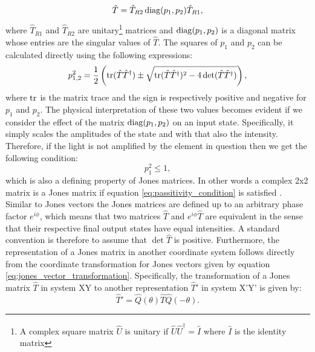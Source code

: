 \begin{equation}
    \label{eq:jones_singular_value_decomposition}
    \hat{T} = \hat{T}_{R2}\operatorname{diag}(p_1, p_2)\hat{T}_{R1},
\end{equation}
where $\hat{T}_{R1}$ and $\hat{T}_{R2}$ are unitary\footnote{A complex square matrix $\hat{U}$ is unitary if $\hat{U} \hat{U}^\dagger=\hat{I}$ where $\hat{I}$ is the identity matrix} matrices and $\operatorname{diag}(p_1, p_2)$ is a diagonal matrix whose entries are the singular values of $\hat{T}$. The squares of $p_1$ and $p_2$ can be calculated directly using the following expressions:
\begin{equation}
    p_{1,2}^2 = \frac{1}{2}\left(\operatorname{tr}(\hat{T}\hat{T}^{\dagger}) \pm 
    \sqrt{\operatorname{tr}(\hat{T}\hat{T}^{\dagger})^2-4\det(\hat{T}\hat{T}^{\dagger})}\right),
\end{equation}
where $\operatorname{tr}$ is the matrix trace and the sign is respectively positive and negative for $p_1$ and $p_2$. The physical interpretation of these two values becomes evident if we consider the effect of the matrix $\operatorname{diag}(p_1, p_2)$ on an input state. Specifically, it simply scales the amplitudes of the state and with that also the intensity. Therefore, if the light is not amplified by the element in question then we get the following condition:
\begin{equation}
    \label{eq:passitivity_condition}
    p_1^2 \leq 1,
\end{equation}
which is also a defining property of Jones matrices. In other words a complex 2x2 matrix is a Jones matrix if equation \ref{eq:passitivity_condition} is satisfied \cite{Barakat1987ConditionsSystems}. Similar to Jones vectors the Jones matrices are defined up to an arbitrary phase factor $e^{i\phi}$, which means that two matrices $\hat{T}$ and $e^{i\phi}\hat{T}$ are equivalent in the sense that their respective final output states have equal intensities. A standard convention is therefore to assume that $\det \hat{T}$ is positive. Furthermore, the representation of a Jones matrix in another coordinate system follows directly from the coordinate transformation for Jones vectors given by equation \ref{eq:jones_vector_transformation}. Specifically, the transformation of a Jones matrix $\hat{T}$ in system XY to another representation $\hat{T}'$ in system X'Y' is given by:
\begin{equation}
    \label{eq:jones_matrix_transformation}
    \hat{T}' = \hat{Q}(\theta)\hat{T}\hat{Q}(-\theta).
\end{equation}
